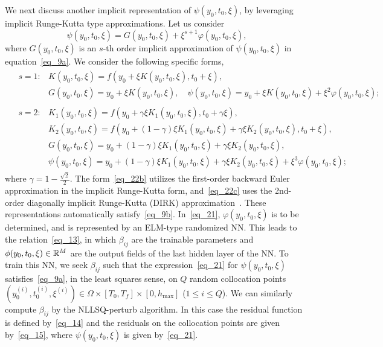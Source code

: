 \begin{remark}
  We next discuss another implicit representation
  of $\psi(y_0,t_0,\xi)$, by leveraging implicit Runge-Kutta type
  approximations. Let us consider
  \begin{equation}\label{eq_21}
    \psi(y_0,t_0,\xi) = G(y_0,t_0,\xi) + \xi^{s+1}\varphi(y_0,t_0,\xi),
  \end{equation}
  where $G(y_0,t_0,\xi)$ is an $s$-th order implicit 
  approximation of $\psi(y_0,t_0,\xi)$ in equation~\eqref{eq_9a}.
  We consider the following specific forms,
  \begin{subequations}\label{eq_22}
    \begin{align}
      & \label{eq_22b}
      \begin{array}{lll}
        s = 1: & K(y_0,t_0,\xi) = f(y_0+\xi K(y_0,t_0,\xi), t_0+\xi),\\
        & G(y_0,t_0,\xi) = y_0 + \xi K(y_0,t_0,\xi), \quad
         \psi(y_0,t_0,\xi) = y_0+\xi K(y_0,t_0,\xi) + \xi^2\varphi(y_0,t_0,\xi);
      \end{array} \\
      & \label{eq_22c}
      \begin{array}{lll}
        s = 2: & K_1(y_0,t_0,\xi) = f(y_0+\gamma\xi K_1(y_0,t_0,\xi), t_0+\gamma\xi),\\
        & K_2(y_0,t_0,\xi) = f(y_0+(1-\gamma)\xi K_1(y_0,t_0,\xi) + \gamma\xi K_2(y_0,t_0,\xi),t_0+\xi), \\
        & G(y_0,t_0,\xi) = y_0+(1-\gamma)\xi K_1(y_0,t_0,\xi) + \gamma\xi K_2(y_0,t_0,\xi), \\
        & \psi(y_0,t_0,\xi) = y_0+(1-\gamma)\xi K_1(y_0,t_0,\xi) + \gamma\xi K_2(y_0,t_0,\xi)
        + \xi^3\varphi(y_0,t_0,\xi);
      \end{array}
    \end{align} 
  \end{subequations}
  where $\gamma = 1-\frac{\sqrt{2}}{2}$.
  The form~\eqref{eq_22b}
  utilizes the first-order backward Euler approximation
  in the implicit Runge-Kutta form, and~\eqref{eq_22c} uses the 2nd-order
  diagonally implicit Runge-Kutta (DIRK) approximation~\cite{HairerW1996,KenedyC2016}.
  These representations automatically satisfy~\eqref{eq_9b}.
  In~\eqref{eq_21}, $\varphi(y_0,t_0,\xi)$ is to be determined, and  is represented by
  an ELM-type randomized NN.
  This leads to the relation~\eqref{eq_13}, in which $\beta_{ij}$
  are the trainable parameters
  and $\phi(y_0,t_0,\xi)\in\mathbb{R}^M$ are the output fields of
  the last hidden layer of the NN.
  To train this NN,
  we seek  $\beta_{ij}$
  such that the expression~\eqref{eq_21} for $\psi(y_0,t_0,\xi)$
  satisfies~\eqref{eq_9a}, in the least squares sense,
  on  $Q$
  random collocation points $(y_0^{(i)},t_0^{(i)},\xi^{(i)})\in\Omega\times[T_0,T_f]\times[0,h_{\max}]$
  ($1\leqslant i\leqslant Q$). We can similarly compute $\beta_{ij}$
  by the NLLSQ-perturb algorithm. In this case the residual function
  is defined by~\eqref{eq_14} and the residuals on
  the collocation points are given by~\eqref{eq_15}, where $\psi(y_0,t_0,\xi)$
  is given by~\eqref{eq_21}.


\end{remark}
